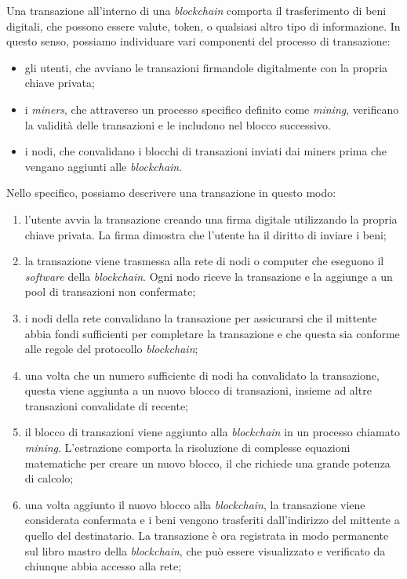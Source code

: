 Una transazione all'interno di una \textit{blockchain} comporta il trasferimento di beni digitali, che possono essere valute, token, o qualsiasi altro tipo di informazione.
In questo senso, possiamo individuare vari componenti del processo di transazione:
\begin{itemize}
    \item{gli utenti}, che avviano le transazioni firmandole digitalmente con la propria chiave privata;
    \item{i \textit{miners}}, che attraverso un processo specifico definito come \textit{mining}, verificano la validità delle transazioni e le includono nel blocco successivo. 
    \item{i nodi}, che convalidano i blocchi di transazioni inviati dai miners prima che vengano aggiunti alle \textit{blockchain}.
\end{itemize}

Nello specifico, possiamo descrivere una transazione in questo modo:
\begin{enumerate}
    \item l'utente avvia la transazione creando una firma digitale utilizzando la propria chiave privata. La firma dimostra che l'utente ha il diritto di inviare i beni;
    \item la transazione viene trasmessa alla rete di nodi o computer che eseguono il \textit{software} della \textit{blockchain}. Ogni nodo riceve la transazione e la aggiunge a un pool di transazioni non confermate;
    \item i nodi della rete convalidano la transazione per assicurarsi che il mittente abbia fondi sufficienti per completare la transazione e che questa sia conforme alle regole del protocollo \textit{blockchain};
    \item una volta che un numero sufficiente di nodi ha convalidato la transazione, questa viene aggiunta a un nuovo blocco di transazioni, insieme ad altre transazioni convalidate di recente;
    \item il blocco di transazioni viene aggiunto alla \textit{blockchain} in un processo chiamato \textit{mining}. L'estrazione comporta la risoluzione di complesse equazioni matematiche per creare un nuovo blocco, il che richiede una grande potenza di calcolo;
    \item una volta aggiunto il nuovo blocco alla \textit{blockchain}, la transazione viene considerata confermata e i beni vengono trasferiti dall'indirizzo del mittente a quello del destinatario. La transazione è ora registrata in modo permanente sul libro mastro della \textit{blockchain}, che può essere visualizzato e verificato da chiunque abbia accesso alla rete;
\end{enumerate}

